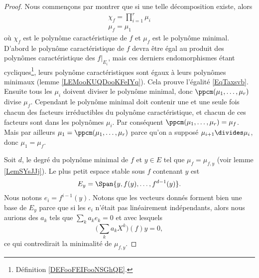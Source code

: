 \begin{proof}
    Nous commençons par montrer que si une telle décomposition existe, alors
    \begin{subequations}    \label{subEqzcGouz}
        \begin{align}
            \chi_f=\prod_{i=1}^r\mu_i  \label{EqTaxsvb}\\
            \mu_f=\mu_1
        \end{align}
    \end{subequations}
    où \( \chi_f\) est le polynôme caractéristique de \( f\) et \( \mu_f\) est le polynôme minimal. D'abord le polynôme caractéristique de \( f\) devra être égal au produit des polynômes caractéristique des \( f|_{E_i}\), mais ces derniers endomorphismes étant cycliques\footnote{Définition \ref{DEFooFEIFooNSGhQE}.}, leurs polynôme caractéristiques sont égaux à leurs polynômes minimaux (lemme \ref{LEMooKUQDooKFeIYq}). Cela prouve l'égalité \eqref{EqTaxsvb}. Ensuite tous les \( \mu_i\) doivent diviser le polynôme minimal, donc \( \ppcm(\mu_1,\ldots, \mu_r)\) divise \(\mu_f\). Cependant le polynôme minimal doit contenir une et une seule fois chacun des facteurs irréductibles du polynôme caractéristique, et chacun de ces facteurs sont dans les polynômes \( \mu_i\). Par conséquent \( \ppcm(\mu_1,\ldots, \mu_r)=\mu_f\). Mais par ailleurs \( \mu_1=\ppcm(\mu_1,\ldots, \mu_r)\) parce qu'on a supposé \( \mu_{i+1}\divides \mu_i\), donc \( \mu_1=\mu_f\).
    
    Soit \( d\), le degré du polynôme minimal de \( f\) et \( y\in E\) tel que \( \mu_f=\mu_{f,y}\) (voir lemme \ref{LemSYsJJj}). Le plus petit espace stable sous \( f\) contenant \( y\) est
    \begin{equation}
        E_y=\Span\{ y,f(y),\ldots, f^{d-1}(y) \}.
    \end{equation}
    Nous notons \( e_i=f^{i-1}(y)\). Notons que les vecteurs donnés forment bien une base de \( E_y\) parce que si les \( e_i\) n'était pas linéairement indépendants, alors nous aurions des \( a_k\) tels que \( \sum_ka_ke_k=0\) et avec lesquels
    \begin{equation}
        \big( \sum_ka_kX^k \big)(f)y=0,
    \end{equation}
    ce qui contredirait la minimalité de \( \mu_{f,y}\).


\end{proof}
